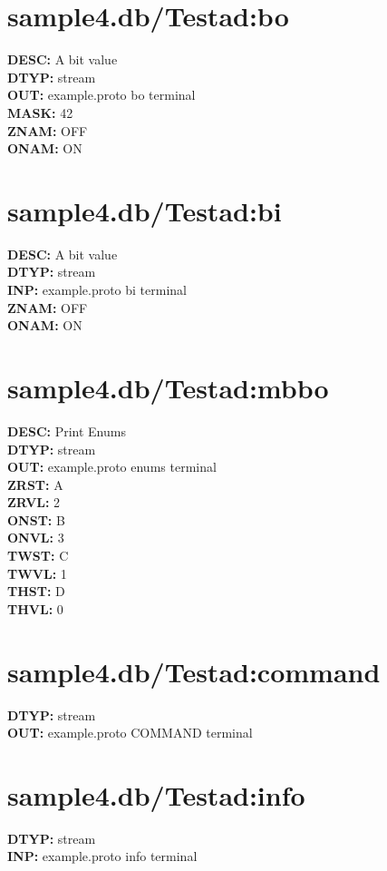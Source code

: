 \documentclass[12pt]{article}
\begin{document}
\section{sample4.db/Test\textunderscore ad:bo}
\textbf{DESC: }A bit value \\
\textbf{DTYP: }stream \\
\textbf{OUT: }example.proto bo terminal \\
\textbf{MASK: }42 \\
\textbf{ZNAM: }OFF \\
\textbf{ONAM: }ON \\
\newpage
\section{sample4.db/Test\textunderscore ad:bi}
\textbf{DESC: }A bit value \\
\textbf{DTYP: }stream \\
\textbf{INP: }example.proto bi terminal \\
\textbf{ZNAM: }OFF \\
\textbf{ONAM: }ON \\
\newpage
\section{sample4.db/Test\textunderscore ad:mbbo}
\textbf{DESC: }Print Enums \\
\textbf{DTYP: }stream \\
\textbf{OUT: }example.proto enums terminal \\
\textbf{ZRST: }A \\
\textbf{ZRVL: }2 \\
\textbf{ONST: }B \\
\textbf{ONVL: }3 \\
\textbf{TWST: }C \\
\textbf{TWVL: }1 \\
\textbf{THST: }D \\
\textbf{THVL: }0 \\
\newpage
\section{sample4.db/Test\textunderscore ad:command}
\textbf{DTYP: }stream \\
\textbf{OUT: }example.proto COMMAND terminal \\
\newpage
\section{sample4.db/Test\textunderscore ad:info}
\textbf{DTYP: }stream \\
\textbf{INP: }example.proto info terminal \\
\newpage
\end{document}
